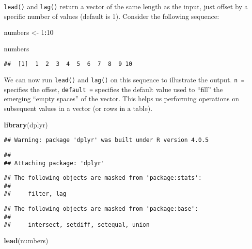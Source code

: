 \documentclass[
]{article}
\newenvironment{Shaded}{\begin{snugshade}}{\end{snugshade}}
\newcommand{\DecValTok}[1]{\textcolor[rgb]{0.00,0.00,0.81}{#1}}
\newcommand{\KeywordTok}[1]{\textcolor[rgb]{0.13,0.29,0.53}{\textbf{#1}}}
\newcommand{\NormalTok}[1]{#1}
\newcommand{\OperatorTok}[1]{\textcolor[rgb]{0.81,0.36,0.00}{\textbf{#1}}}
\newcommand{\StringTok}[1]{\textcolor[rgb]{0.31,0.60,0.02}{#1}}
\begin{document}
\texttt{lead()} and \texttt{lag()} return a vector of the same length as
the input, just offset by a specific number of values (default is 1).
Consider the following sequence:

\begin{Shaded}
\begin{Highlighting}[]
\NormalTok{numbers <-}\StringTok{ }\DecValTok{1}\OperatorTok{:}\DecValTok{10}

\NormalTok{numbers}
\end{Highlighting}
\end{Shaded}

\begin{verbatim}
##  [1]  1  2  3  4  5  6  7  8  9 10
\end{verbatim}

We can now run \texttt{lead()} and \texttt{lag()} on this sequence to
illustrate the output. \texttt{n\ =} specifies the offset,
\texttt{default\ =} specifies the default value used to ``fill'' the
emerging ``empty spaces'' of the vector. This helps us performing
operations on subsequent values in a vector (or rows in a table).

\begin{Shaded}
\begin{Highlighting}[]
\KeywordTok{library}\NormalTok{(dplyr)}
\end{Highlighting}
\end{Shaded}

\begin{verbatim}
## Warning: package 'dplyr' was built under R version 4.0.5
\end{verbatim}

\begin{verbatim}
## 
## Attaching package: 'dplyr'
\end{verbatim}

\begin{verbatim}
## The following objects are masked from 'package:stats':
## 
##     filter, lag
\end{verbatim}

\begin{verbatim}
## The following objects are masked from 'package:base':
## 
##     intersect, setdiff, setequal, union
\end{verbatim}

\begin{Shaded}
\begin{Highlighting}[]
\KeywordTok{lead}\NormalTok{(numbers)}
\end{Highlighting}
\end{Shaded}
\end{document}
